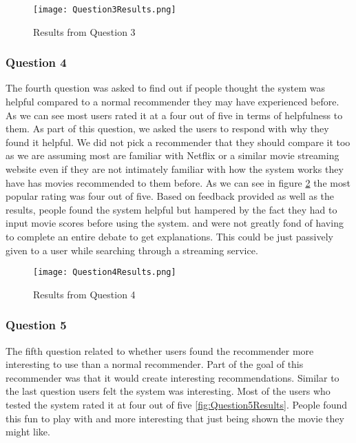                 \begin{figure}
                    \centering
                    \texttt{[image: Question3Results.png]}
                    \caption{Results from Question 3}
                    \label{fig:Question3Results}
                \end{figure}



            \subsubsection{Question 4}

                The fourth question was asked to find out if people thought the system was helpful compared to a normal recommender they may have experienced before. As we can see most users rated it at a four out of five in terms of helpfulness to them. As part of this question, we asked the users to respond with why they found it helpful. We did not pick a recommender that they should compare it too as we are assuming most are familiar with Netflix or a similar movie streaming website even if they are not intimately familiar with how the system works they have has movies recommended to them before. As we can see in figure \ref{fig:Question4Results} the most popular rating was four out of five. Based on feedback provided as well as the results, people found the system helpful but hampered by the fact they had to input movie scores before using the system. and were not greatly fond of having to complete an entire debate to get explanations. This could be just passively given to a user while searching through a streaming service. 

                \begin{figure}
                    \centering
                    \texttt{[image: Question4Results.png]}
                    \caption{Results from Question 4}
                    \label{fig:Question4Results}
                \end{figure}


            \subsubsection{Question 5}
                The fifth question related to whether users found the recommender more interesting to use than a normal recommender. Part of the goal of this recommender was that it would create interesting recommendations. Similar to the last question users felt the system was interesting. Most of the users who tested the system rated it at four out of five \ref{fig:Question5Results}. People found this fun to play with and more interesting that just being shown the movie they might like. 

